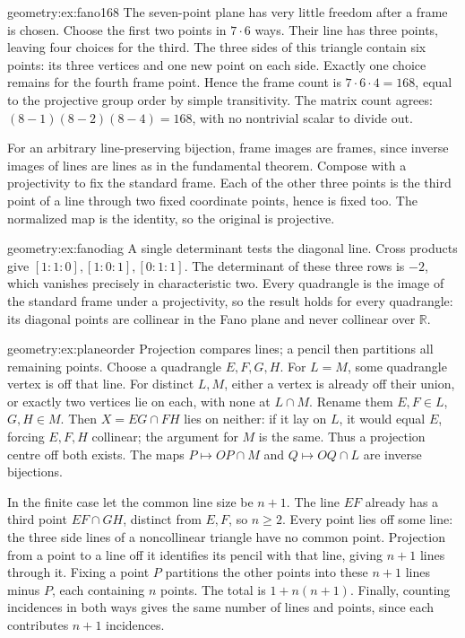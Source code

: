\begin{solution}{geometry:ex:fano168}
\idea The seven-point plane has very little freedom after a frame is chosen.
\writeup Choose the first two points in $7\cdot6$ ways. Their line has three points, leaving four choices for the third. The three sides of this triangle contain six points: its three vertices and one new point on each side. Exactly one choice remains for the fourth frame point. Hence the frame count is $7\cdot6\cdot4=168$, equal to the projective group order by simple transitivity. The matrix count agrees: $(8-1)(8-2)(8-4)=168$, with no nontrivial scalar to divide out.

For an arbitrary line-preserving bijection, frame images are frames, since inverse images of lines are lines as in the fundamental theorem. Compose with a projectivity to fix the standard frame. Each of the other three points is the third point of a line through two fixed coordinate points, hence is fixed too. The normalized map is the identity, so the original is projective.
\end{solution}
\begin{solution}{geometry:ex:fanodiag}
\idea A single determinant tests the diagonal line.
\writeup Cross products give $[1:1:0],[1:0:1],[0:1:1]$. The determinant of these three rows is $-2$, which vanishes precisely in characteristic two. Every quadrangle is the image of the standard frame under a projectivity, so the result holds for every quadrangle: its diagonal points are collinear in the Fano plane and never collinear over $\mathbb R$.
\end{solution}
\begin{solution}{geometry:ex:planeorder}
\idea Projection compares lines; a pencil then partitions all remaining points.
\writeup Choose a quadrangle $E,F,G,H$. For $L=M$, some quadrangle vertex is off that line. For distinct $L,M$, either a vertex is already off their union, or exactly two vertices lie on each, with none at $L\cap M$. Rename them $E,F\in L$, $G,H\in M$. Then $X=EG\cap FH$ lies on neither: if it lay on $L$, it would equal $E$, forcing $E,F,H$ collinear; the argument for $M$ is the same. Thus a projection centre off both exists. The maps $P\mapsto OP\cap M$ and $Q\mapsto OQ\cap L$ are inverse bijections.

In the finite case let the common line size be $n+1$. The line $EF$ already has a third point $EF\cap GH$, distinct from $E,F$, so $n\ge2$. Every point lies off some line: the three side lines of a noncollinear triangle have no common point. Projection from a point to a line off it identifies its pencil with that line, giving $n+1$ lines through it. Fixing a point $P$ partitions the other points into these $n+1$ lines minus $P$, each containing $n$ points. The total is $1+n(n+1)$. Finally, counting incidences in both ways gives the same number of lines and points, since each contributes $n+1$ incidences.
\end{solution}
